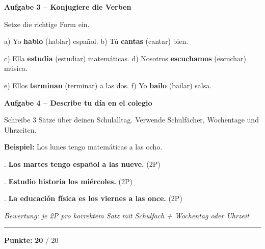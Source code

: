 \documentclass[11pt, a4paper]{article}
\newcommand{\fachfarbe}{spanisch}
\newcommand{\maxpunkte}{20}
\newcommand{\punktebox}[1]{\hfill\fbox{\small \_/#1}}
\newcommand{\lsg}[1]{\textcolor{loesung}{\textbf{#1}}}
\newenvironment{aufgabe}[1]{%
    \needspace{5\baselineskip}%
    \nopagebreak[4]%
    \vspace{10pt}
    \noindent\textbf{\textcolor{\fachfarbe}{Aufgabe #1}}
    \nopagebreak[4]%
    \vspace{5pt}
    \nopagebreak[4]%
    \begin{list}{}{\leftmargin=0pt}
    \item[]
}{%
    \end{list}
}
\begin{document}
\vspace{10pt}


\begin{aufgabe}{3 -- Konjugiere die Verben}
Setze die richtige Form ein. \punktebox{6}
\end{aufgabe}

\noindent
a) Yo \lsg{hablo} (hablar) español. \hfill
b) Tú \lsg{cantas} (cantar) bien.

\vspace{0.8em}

\noindent
c) Ella \lsg{estudia} (estudiar) matemáticas. \hfill
d) Nosotros \lsg{escuchamos} (escuchar) música.

\vspace{0.8em}

\noindent
e) Ellos \lsg{terminan} (terminar) a las dos. \hfill
f) Yo \lsg{bailo} (bailar) salsa.

\vspace{15pt}


\begin{aufgabe}{4 -- Describe tu día en el colegio}
Schreibe 3 Sätze über deinen Schulalltag. Verwende Schulfächer, Wochentage und Uhrzeiten. \punktebox{6}
\end{aufgabe}

\noindent
\textbf{Beispiel:} Los lunes tengo matemáticas a las ocho.

\vspace{0.8em}

. \lsg{Los martes tengo español a las nueve.} \hfill (2P)

\vspace{0.8em}

. \lsg{Estudio historia los miércoles.} \hfill (2P)

\vspace{0.8em}

. \lsg{La educación física es los viernes a las once.} \hfill (2P)

\vspace{0.5em}

\noindent
\textcolor{loesung}{\textit{Bewertung: je 2P pro korrektem Satz mit Schulfach + Wochentag oder Uhrzeit}}


\vspace{20pt}
\hrule
\vspace{10pt}

\begin{flushright}
\textbf{Punkte:} \lsg{20} / \maxpunkte
\end{flushright}
\end{document}
